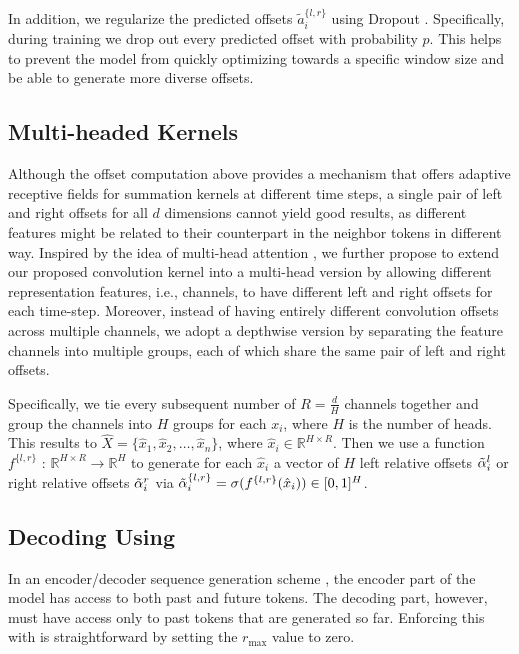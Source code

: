 \documentclass{article}
\begin{document}
In addition, we regularize the predicted offsets $\tilde{a}_i^{\{l,r\}}$ using Dropout \cite{DBLP:journals/corr/abs-1207-0580,JMLR:v15:srivastava14a}. Specifically, during training we drop out every predicted offset with probability $p$. This helps to prevent the model from quickly optimizing towards a specific window size and be able to generate more diverse offsets.

\subsection{Multi-headed Kernels}
\label{sec:mhk}

Although the offset computation above provides a mechanism that offers adaptive receptive fields for summation kernels at different time steps, a single pair of left and right offsets for all $d$ dimensions cannot yield good results, as different features might be related to their counterpart in the neighbor tokens in different way. Inspired by the idea of multi-head attention \cite{vaswani2017attention,wu2019pay}, we further propose to extend our proposed convolution kernel into a multi-head version by allowing different representation features, i.e., channels, to have different left and right offsets for each time-step. Moreover, instead of having entirely different convolution offsets across multiple channels, we adopt a depthwise version by separating the feature channels into multiple groups, each of which share the same pair of left and right offsets.

Specifically, we tie every subsequent number of $R=\frac{d}{H}$ channels together and group the channels into $H$ groups for each $x_i$, where $H$ is the number of heads. This results to $\hat{X} = \{\hat{x}_1, \hat{x}_2, \ldots, \hat{x}_n\}$, where $\hat{x}_i \in \mathbb{R}^{H{\times}R}$. Then we use a function $f^{\{l,r\}}$ : $\mathbb{R}^{H\times R} \rightarrow \mathbb{R}^{H}$  to generate for each $\hat{x}_i$ a vector of $H$ left relative offsets $\tilde{\bf \alpha}_i^l$ or right relative offsets $\tilde{\bf \alpha}_i^r$  via  $\tilde{\bf \alpha}_i^{\{l,r\}} = \sigma(f^{\{l,r\}}(\hat{x}_i)) \in [0,1]^H$.

\subsection{Decoding Using {\talkconvfulls}}
In an encoder/decoder sequence generation scheme \cite{DBLP:journals/corr/SutskeverVL14}, the encoder part of the model has access to both past and future tokens. The decoding part, however, must have access only to past tokens that are generated so far. Enforcing this with {\talkconvfulls} is straightforward by setting the $r_\text{max}$ value to zero.
\end{document}
